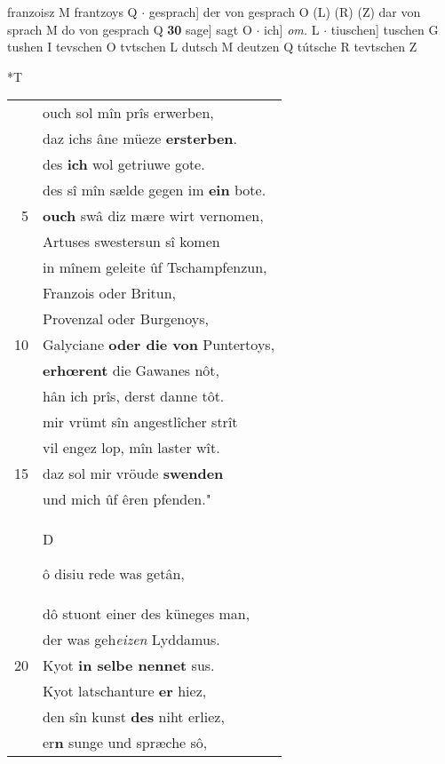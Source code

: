 \documentclass[8pt,a4paper,notitlepage]{article}
\begin{document}
\begin{table}[ht]
\begin{minipage}[t]{0.5\linewidth}
franzoisz M frantzoys Q  $\cdot$ gesprach] der von gesprach O (L) (R) (Z) dar von sprach M do von gesprach Q \textbf{30} sage] sagt O  $\cdot$ ich] \textit{om.} L  $\cdot$ tiuschen] tuschen G tushen I tevschen O tvtschen L dutsch M deutzen Q tútsche R tevtschen Z \newline
\end{minipage}
\hspace{0.5cm}
\begin{minipage}[t]{0.5\linewidth}
\small
\begin{center}*T
\end{center}
\begin{tabular}{rl}
 & ouch sol mîn prîs erwerben,\\ 
 & daz ichs âne müeze \textbf{ersterben}.\\ 
 & des \textbf{ich} wol getriuwe gote.\\ 
 & des sî mîn sælde gegen im \textbf{ein} bote.\\ 
5 & \textbf{ouch} swâ diz mære wirt vernomen,\\ 
 & Artuses swestersun sî komen\\ 
 & in mînem geleite ûf Tschampfenzun,\\ 
 & Franzois oder Britun,\\ 
 & Provenzal oder Burgenoys,\\ 
10 & Galyciane \textbf{oder die von} Puntertoys,\\ 
 & \textbf{erhœrent} die Gawanes nôt,\\ 
 & hân ich prîs, derst danne tôt.\\ 
 & mir vrümt sîn angestlîcher strît\\ 
 & vil engez lop, mîn laster wît.\\ 
15 & daz sol mir vröude \textbf{swenden}\\ 
 & und mich ûf êren pfenden."\\ 
 & \begin{large}D\end{large}ô disiu rede was getân,\\ 
 & dô stuont einer des küneges man,\\ 
 & der was geh\textit{eizen} Lyddamus.\\ 
20 & Kyot \textbf{in selbe nennet} sus.\\ 
 & Kyot latschanture \textbf{er} hiez,\\ 
 & den sîn kunst \textbf{des} niht erliez,\\ 
 & er\textbf{n} sunge und spræche sô,\\ 

\end{tabular}
\end{minipage}
\end{table}
\end{document}
